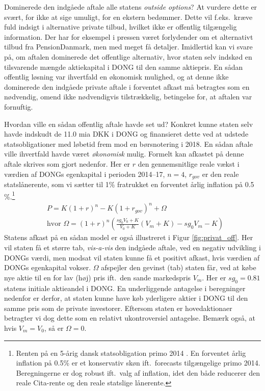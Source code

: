 \documentclass{article}
\begin{document}
Dominerede den indgåede aftale alle statens \emph{outside options}? At vurdere dette er svært, for ikke at sige umuligt, for en ekstern bedømmer. Dette vil f.eks.\ kræve fuld indsigt i alternative private tilbud, hvilket ikke er offentlig tilgængelig information. Der har for eksempel i pressen været forlydender om et alternativt tilbud fra PensionDanmark, men med meget få detaljer. Imidlertid kan vi svare på, om aftalen dominerede det offentlige alternativ, hvor staten selv indskød en tilsvarende mængde aktiekapital i DONG til den samme aktiepris. En sådan offentlig løsning var ihvertfald en økonomisk mulighed, og at denne ikke dominerede den indgåede private aftale i forventet afkast må betragtes som en nødvendig, omend ikke nødvendigvis tilstrækkelig, betingelse for, at aftalen var fornuftig. 

Hvordan ville en sådan offentlig aftale havde set ud? Konkret kunne staten selv havde indskudt de 11.0 mia DKK i DONG og finansieret dette ved at udstede statsobligationer med løbetid frem mod en børsnotering i 2018. En sådan aftale ville ihvertfald havde været \emph{økonomisk} mulig. Formelt kan afkastet på denne aftale skrives som gjort nedenfor. Her er $r$ den gennemsnitlige reale vækst i værdien af DONGs egenkapital i perioden 2014--17, $n=4$, $r_{\mathit{gov}}$ er den reale statslånerente, som vi sætter til 1\% fratrukket en forventet årlig inflation på 0.5 \%.\footnote{Renten på en 5-årig dansk statsobligation primo 2014 \citep{NB2014}. En forventet årlig inflation på 0.5\% er et konservativ skøn ift.\ forecasts tilgængelige primo 2014. Beregningerne er dog robust ift.\ valg af inflation, idet den både reducerer den reale Cita-rente og den reale statslige lånerente.}
\begin{align}
&P=K(1+r)^n-K(1+r_{gov})^n +\Omega \\
&\text{hvor } \Omega=(1+r)^n\left( \frac{sg_0 V_0+K}{V_0+K} \left( V_m+K \right)-sg_0 V_m -K\right)\nonumber
\label{eq:gov_capital}
\end{align}
Statens afkast på en sådan model er også illustreret i Figur \ref{fig:privat_off}. Her vil staten få et større tab, \emph{vis-a-vis} den indgåede aftale, ved en negativ udvikling i DONGs værdi, men modsat vil staten kunne få et positivt afkast, hvis værdien af DONGs egenkapital vokser. $\Omega$ afspejler den gevinst (tab) staten får, ved at købe nye aktie til en for lav (høj) pris ift.\ den sande markedspris $V_m$. Her er $sg_0=0.81$ statens initiale aktieandel i DONG. En underliggende antagelse i beregninger nedenfor er derfor, at staten kunne have køb yderligere aktier i DONG til den samme pris som de private investorer. Eftersom staten er hovedaktionaer betragter vi dog dette som en relativt ukontroversiel antagelse. Bemærk også, at hvis $V_m=V_0$, så er $\Omega=0$.
\end{document}
